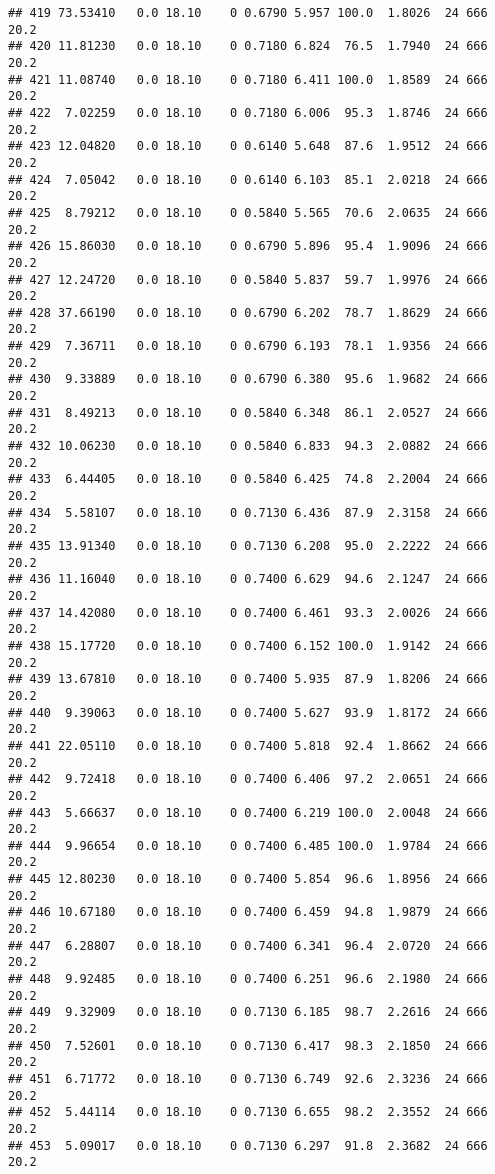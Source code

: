 \documentclass[]{article}
\begin{document}
\begin{verbatim}
## 419 73.53410   0.0 18.10    0 0.6790 5.957 100.0  1.8026  24 666    20.2
## 420 11.81230   0.0 18.10    0 0.7180 6.824  76.5  1.7940  24 666    20.2
## 421 11.08740   0.0 18.10    0 0.7180 6.411 100.0  1.8589  24 666    20.2
## 422  7.02259   0.0 18.10    0 0.7180 6.006  95.3  1.8746  24 666    20.2
## 423 12.04820   0.0 18.10    0 0.6140 5.648  87.6  1.9512  24 666    20.2
## 424  7.05042   0.0 18.10    0 0.6140 6.103  85.1  2.0218  24 666    20.2
## 425  8.79212   0.0 18.10    0 0.5840 5.565  70.6  2.0635  24 666    20.2
## 426 15.86030   0.0 18.10    0 0.6790 5.896  95.4  1.9096  24 666    20.2
## 427 12.24720   0.0 18.10    0 0.5840 5.837  59.7  1.9976  24 666    20.2
## 428 37.66190   0.0 18.10    0 0.6790 6.202  78.7  1.8629  24 666    20.2
## 429  7.36711   0.0 18.10    0 0.6790 6.193  78.1  1.9356  24 666    20.2
## 430  9.33889   0.0 18.10    0 0.6790 6.380  95.6  1.9682  24 666    20.2
## 431  8.49213   0.0 18.10    0 0.5840 6.348  86.1  2.0527  24 666    20.2
## 432 10.06230   0.0 18.10    0 0.5840 6.833  94.3  2.0882  24 666    20.2
## 433  6.44405   0.0 18.10    0 0.5840 6.425  74.8  2.2004  24 666    20.2
## 434  5.58107   0.0 18.10    0 0.7130 6.436  87.9  2.3158  24 666    20.2
## 435 13.91340   0.0 18.10    0 0.7130 6.208  95.0  2.2222  24 666    20.2
## 436 11.16040   0.0 18.10    0 0.7400 6.629  94.6  2.1247  24 666    20.2
## 437 14.42080   0.0 18.10    0 0.7400 6.461  93.3  2.0026  24 666    20.2
## 438 15.17720   0.0 18.10    0 0.7400 6.152 100.0  1.9142  24 666    20.2
## 439 13.67810   0.0 18.10    0 0.7400 5.935  87.9  1.8206  24 666    20.2
## 440  9.39063   0.0 18.10    0 0.7400 5.627  93.9  1.8172  24 666    20.2
## 441 22.05110   0.0 18.10    0 0.7400 5.818  92.4  1.8662  24 666    20.2
## 442  9.72418   0.0 18.10    0 0.7400 6.406  97.2  2.0651  24 666    20.2
## 443  5.66637   0.0 18.10    0 0.7400 6.219 100.0  2.0048  24 666    20.2
## 444  9.96654   0.0 18.10    0 0.7400 6.485 100.0  1.9784  24 666    20.2
## 445 12.80230   0.0 18.10    0 0.7400 5.854  96.6  1.8956  24 666    20.2
## 446 10.67180   0.0 18.10    0 0.7400 6.459  94.8  1.9879  24 666    20.2
## 447  6.28807   0.0 18.10    0 0.7400 6.341  96.4  2.0720  24 666    20.2
## 448  9.92485   0.0 18.10    0 0.7400 6.251  96.6  2.1980  24 666    20.2
## 449  9.32909   0.0 18.10    0 0.7130 6.185  98.7  2.2616  24 666    20.2
## 450  7.52601   0.0 18.10    0 0.7130 6.417  98.3  2.1850  24 666    20.2
## 451  6.71772   0.0 18.10    0 0.7130 6.749  92.6  2.3236  24 666    20.2
## 452  5.44114   0.0 18.10    0 0.7130 6.655  98.2  2.3552  24 666    20.2
## 453  5.09017   0.0 18.10    0 0.7130 6.297  91.8  2.3682  24 666    20.2

\end{verbatim}
\end{document}
